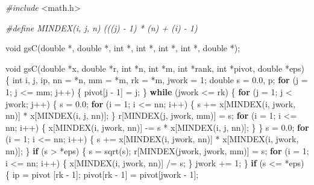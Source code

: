 \documentclass[12pt,]{article}
\newenvironment{Shaded}{\begin{snugshade}}{\end{snugshade}}
\newcommand{\DataTypeTok}[1]{\textcolor[rgb]{0.13,0.29,0.53}{#1}}
\newcommand{\DecValTok}[1]{\textcolor[rgb]{0.00,0.00,0.81}{#1}}
\newcommand{\FloatTok}[1]{\textcolor[rgb]{0.00,0.00,0.81}{#1}}
\newcommand{\ImportTok}[1]{#1}
\newcommand{\ControlFlowTok}[1]{\textcolor[rgb]{0.13,0.29,0.53}{\textbf{#1}}}
\newcommand{\PreprocessorTok}[1]{\textcolor[rgb]{0.56,0.35,0.01}{\textit{#1}}}
\newcommand{\NormalTok}[1]{#1}
\begin{document}
\begin{Shaded}
\begin{Highlighting}[]
\PreprocessorTok{#include }\ImportTok{<math.h>}

\PreprocessorTok{#define MINDEX(i, j, n) (((j) - 1) * (n) + (i) - 1)}

\DataTypeTok{void}\NormalTok{ gsC(}\DataTypeTok{double}\NormalTok{ *, }\DataTypeTok{double}\NormalTok{ *, }\DataTypeTok{int}\NormalTok{ *, }\DataTypeTok{int}\NormalTok{ *, }\DataTypeTok{int}\NormalTok{ *, }\DataTypeTok{int}\NormalTok{ *, }\DataTypeTok{double}\NormalTok{ *);}

\DataTypeTok{void}\NormalTok{ gsC(}\DataTypeTok{double}\NormalTok{ *x, }\DataTypeTok{double}\NormalTok{ *r, }\DataTypeTok{int}\NormalTok{ *n, }\DataTypeTok{int}\NormalTok{ *m, }\DataTypeTok{int}\NormalTok{ *rank, }\DataTypeTok{int}\NormalTok{ *pivot,}
         \DataTypeTok{double}\NormalTok{ *eps) \{}
  \DataTypeTok{int}\NormalTok{ i, j, ip, nn = *n, mm = *m, rk = *m, jwork = }\DecValTok{1}\NormalTok{;}
  \DataTypeTok{double}\NormalTok{ s = }\FloatTok{0.0}\NormalTok{, p;}
  \ControlFlowTok{for}\NormalTok{ (j = }\DecValTok{1}\NormalTok{; j <= mm; j++) \{}
\NormalTok{    pivot[j - }\DecValTok{1}\NormalTok{] = j;}
\NormalTok{  \}}
  \ControlFlowTok{while}\NormalTok{ (jwork <= rk) \{}
    \ControlFlowTok{for}\NormalTok{ (j = }\DecValTok{1}\NormalTok{; j < jwork; j++) \{}
\NormalTok{      s = }\FloatTok{0.0}\NormalTok{;}
      \ControlFlowTok{for}\NormalTok{ (i = }\DecValTok{1}\NormalTok{; i <= nn; i++) \{}
\NormalTok{        s += x[MINDEX(i, jwork, nn)] * x[MINDEX(i, j, nn)];}
\NormalTok{      \}}
\NormalTok{      r[MINDEX(j, jwork, mm)] = s;}
      \ControlFlowTok{for}\NormalTok{ (i = }\DecValTok{1}\NormalTok{; i <= nn; i++) \{}
\NormalTok{        x[MINDEX(i, jwork, nn)] -= s * x[MINDEX(i, j, nn)];}
\NormalTok{      \}}
\NormalTok{    \}}
\NormalTok{    s = }\FloatTok{0.0}\NormalTok{;}
    \ControlFlowTok{for}\NormalTok{ (i = }\DecValTok{1}\NormalTok{; i <= nn; i++) \{}
\NormalTok{      s += x[MINDEX(i, jwork, nn)] * x[MINDEX(i, jwork, nn)];}
\NormalTok{    \}}
    \ControlFlowTok{if}\NormalTok{ (s > *eps) \{}
\NormalTok{      s = sqrt(s);}
\NormalTok{      r[MINDEX(jwork, jwork, mm)] = s;}
      \ControlFlowTok{for}\NormalTok{ (i = }\DecValTok{1}\NormalTok{; i <= nn; i++) \{}
\NormalTok{        x[MINDEX(i, jwork, nn)] /= s;}
\NormalTok{      \}}
\NormalTok{      jwork += }\DecValTok{1}\NormalTok{;}
\NormalTok{    \}}
    \ControlFlowTok{if}\NormalTok{ (s <= *eps) \{}
\NormalTok{      ip = pivot [rk - }\DecValTok{1}\NormalTok{];}
\NormalTok{      pivot[rk - }\DecValTok{1}\NormalTok{] = pivot[jwork - }\DecValTok{1}\NormalTok{];}

\end{Highlighting}
\end{Shaded}
\end{document}
